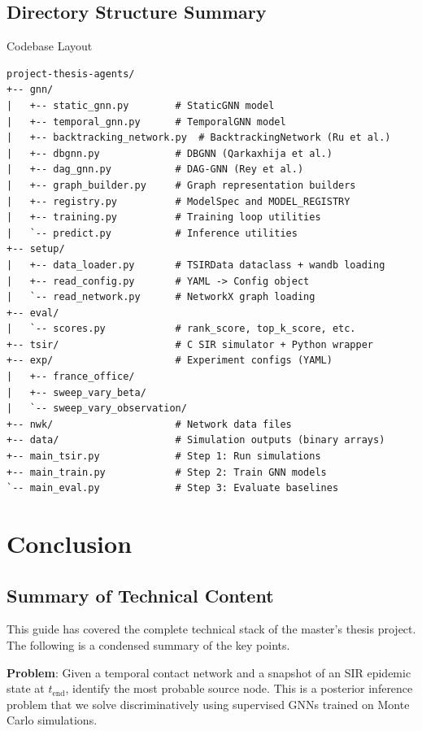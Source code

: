\documentclass[12pt,a4paper]{report}
\begin{document}
\section{Directory Structure Summary}

\begin{codebox}{Codebase Layout}
\begin{verbatim}
project-thesis-agents/
+-- gnn/
|   +-- static_gnn.py        # StaticGNN model
|   +-- temporal_gnn.py      # TemporalGNN model
|   +-- backtracking_network.py  # BacktrackingNetwork (Ru et al.)
|   +-- dbgnn.py             # DBGNN (Qarkaxhija et al.)
|   +-- dag_gnn.py           # DAG-GNN (Rey et al.)
|   +-- graph_builder.py     # Graph representation builders
|   +-- registry.py          # ModelSpec and MODEL_REGISTRY
|   +-- training.py          # Training loop utilities
|   `-- predict.py           # Inference utilities
+-- setup/
|   +-- data_loader.py       # TSIRData dataclass + wandb loading
|   +-- read_config.py       # YAML -> Config object
|   `-- read_network.py      # NetworkX graph loading
+-- eval/
|   `-- scores.py            # rank_score, top_k_score, etc.
+-- tsir/                    # C SIR simulator + Python wrapper
+-- exp/                     # Experiment configs (YAML)
|   +-- france_office/
|   +-- sweep_vary_beta/
|   `-- sweep_vary_observation/
+-- nwk/                     # Network data files
+-- data/                    # Simulation outputs (binary arrays)
+-- main_tsir.py             # Step 1: Run simulations
+-- main_train.py            # Step 2: Train GNN models
`-- main_eval.py             # Step 3: Evaluate baselines
\end{verbatim}
\end{codebox}

\chapter{Conclusion}
\label{chap:conclusion}

\section{Summary of Technical Content}

This guide has covered the complete technical stack of the master's thesis
project. The following is a condensed summary of the key points.

\textbf{Problem}: Given a temporal contact network and a snapshot of an SIR
epidemic state at $t_{\text{end}}$, identify the most probable source node.
This is a posterior inference problem that we solve discriminatively using
supervised GNNs trained on Monte Carlo simulations.
\end{document}
